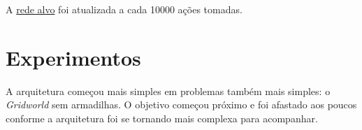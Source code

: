 A \hyperref[sec:fx]{rede alvo} foi atualizada a cada 10000 ações tomadas.

%
%
%
%

\section{Experimentos}
\label{sec:experiments}

A arquitetura começou mais simples em problemas também mais simples: o \textit{Gridworld} sem armadilhas.
O objetivo começou próximo e foi afastado aos poucos conforme a arquitetura foi se tornando mais complexa para acompanhar.
